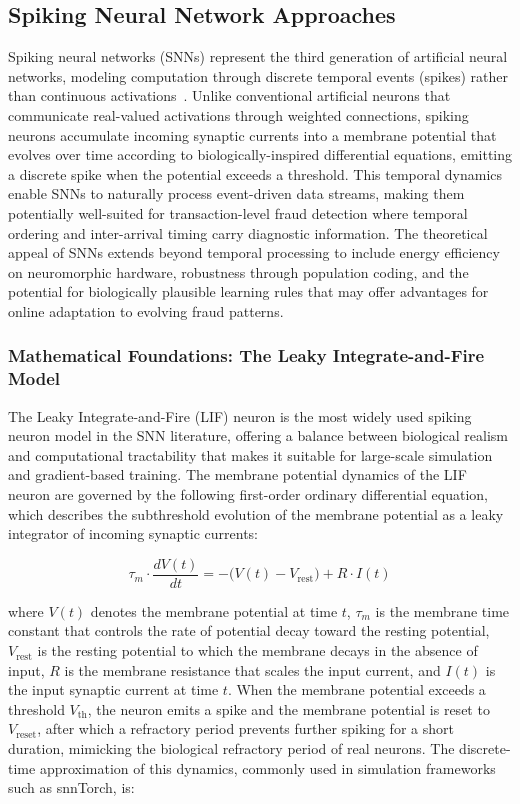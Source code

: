 \subsection{Spiking Neural Network Approaches}

Spiking neural networks (SNNs) represent the third generation of artificial
neural networks, modeling computation through discrete temporal events (spikes)
rather than continuous activations~\cite{maass1997networks}. Unlike conventional
artificial neurons that communicate real-valued activations through weighted
connections, spiking neurons accumulate incoming synaptic currents into a
membrane potential that evolves over time according to biologically-inspired
differential equations, emitting a discrete spike when the potential exceeds a
threshold. This temporal dynamics enable SNNs to naturally process event-driven
data streams, making them potentially well-suited for transaction-level fraud
detection where temporal ordering and inter-arrival timing carry diagnostic
information. The theoretical appeal of SNNs extends beyond temporal processing
to include energy efficiency on neuromorphic hardware, robustness through
population coding, and the potential for biologically plausible learning rules
that may offer advantages for online adaptation to evolving fraud patterns.

\subsubsection{Mathematical Foundations: The Leaky Integrate-and-Fire Model}

The Leaky Integrate-and-Fire (LIF) neuron is the most widely used spiking neuron
model in the SNN literature, offering a balance between biological realism and
computational tractability that makes it suitable for large-scale simulation and
gradient-based training. The membrane potential dynamics of the LIF neuron are
governed by the following first-order ordinary differential equation, which
describes the subthreshold evolution of the membrane potential as a leaky
integrator of incoming synaptic currents:

\begin{equation}
\tau_m \cdot \frac{dV(t)}{dt} = -\bigl(V(t) - V_{\text{rest}}\bigr) + R \cdot I(t)
\end{equation}

where $V(t)$ denotes the membrane potential at time $t$, $\tau_m$ is the
membrane time constant that controls the rate of potential decay toward the
resting potential, $V_{\text{rest}}$ is the resting potential to which the
membrane decays in the absence of input, $R$ is the membrane resistance that
scales the input current, and $I(t)$ is the input synaptic current at time $t$.
When the membrane potential exceeds a threshold $V_{\text{th}}$, the neuron
emits a spike and the membrane potential is reset to $V_{\text{reset}}$, after
which a refractory period prevents further spiking for a short duration,
mimicking the biological refractory period of real neurons. The discrete-time
approximation of this dynamics, commonly used in simulation frameworks such as
snnTorch, is:

